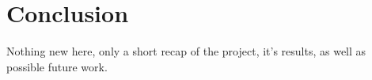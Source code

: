 
\chapter{Conclusion}
\label{ch:Conclusion}

Nothing new here, only a short recap of the project, it's results, as well as possible future work.

